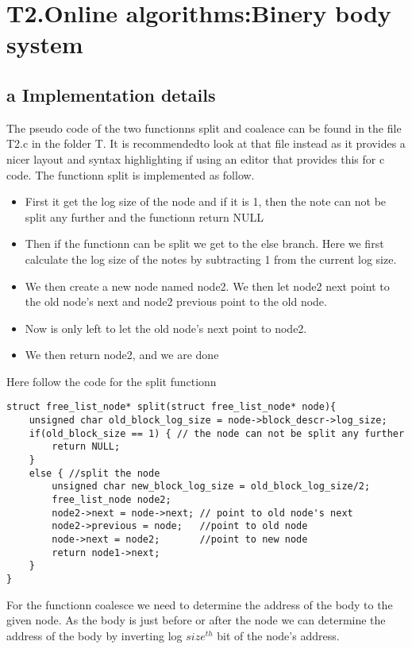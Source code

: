 \documentclass[a4paper,12pt,danish]{report}
\begin{document}
\newpage
\section{T2.Online algorithms:Binery body system}
\subsection{a Implementation details}
The pseudo code of the two functionns split and coaleace can be found in the file
T2.c in the folder T. It is recommendedto look at that file instead as it
provides a nicer layout and syntax highlighting if using an editor that provides this for c
code. 
The functionn split is implemented as follow.

\begin{itemize}
  \item First it get the log size of the node and if it is 1, then the note can
  not be split any further and the functionn return NULL
  \item Then if the functionn can be split we get to the else branch. Here we
  first calculate the log size of the notes by subtracting 1 from the
  current log size.
  \item We then create a new node named node2. We then let node2 next
  point to the old node's next and node2 previous point to the old node.
  \item Now is only left to let the old node's next point to node2.
  \item We then return node2, and we are done 
\end{itemize}
Here follow the code for the split functionn
\begin{verbatim} 
struct free_list_node* split(struct free_list_node* node){
    unsigned char old_block_log_size = node->block_descr->log_size;
    if(old_block_size == 1) { // the node can not be split any further
        return NULL;
    }
    else { //split the node
        unsigned char new_block_log_size = old_block_log_size/2; 
        free_list_node node2;
        node2->next = node->next; // point to old node's next
        node2->previous = node;   //point to old node
        node->next = node2;       //point to new node 
        return node1->next;
    }
}
\end{verbatim}

For the functionn coalesce we need to determine the address of the body to the
given node. As the body is just before or after the node we can determine
the address of the body by inverting log $size^{th}$  bit of the node's address.
\end{document}

